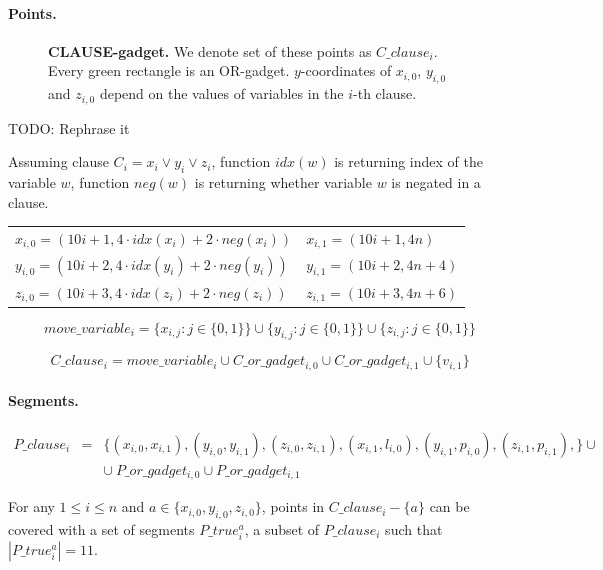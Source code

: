 \paragraph{Points.}


\begin{figure}[h]
\centering
\def\svgwidth{0.8\columnwidth}

\caption{\textbf{CLAUSE-gadget.}
We denote set of these points as $C\_clause_i$.
Every green rectangle is an OR-gadget.
$y$-coordinates of $x_{i, 0}$, $y_{i, 0}$ and $z_{i,0}$
depend on the values of variables in the $i$-th clause.
}
\label{fig:apx_clause}
\end{figure}

TODO: Rephrase it

Assuming clause $C_i = x_i \lor y_i \lor z_i$,
function $idx(w)$ is returning index of the variable $w$,
function $neg(w)$ is returning whether variable $w$ is negated
in a clause.

\begin{center}
\begin{tabular}{ l l }
	$x_{i, 0} = (10i+1, 4\cdot idx(x_i) + 2\cdot neg(x_i))$ &
	$x_{i, 1} = (10i+1, 4n)$ \\
	$y_{i, 0} = (10i+2, 4\cdot idx(y_i) + 2\cdot neg(y_i))$ &
	$y_{i, 1} = (10i+2, 4n + 4)$ \\
	$z_{i, 0} = (10i+3, 4\cdot idx(z_i) + 2\cdot neg(z_i))$ &
	$z_{i, 1} = (10i+3, 4n + 6)$
\end{tabular}
\end{center}
	
 
 $$move\_variable_i = 
 \{x_{i, j} : j \in \{0, 1\}\} \cup
 \{y_{i, j} : j \in \{0, 1\}\} \cup
 \{z_{i, j} : j \in \{0, 1\}\} 
 $$
 
 $$C\_clause_i = 
 move\_variable_i \cup C\_or\_gadget_{i, 0}
 \cup C\_or\_gadget_{i, 1} \cup \{v_{i, 1} \} 
 $$

\paragraph{Segments.}

\begin{eqnarray*}
P\_clause_i & = & \{ (x_{i, 0}, x_{i, 1}),
(y_{i, 0}, y_{i, 1}),
(z_{i, 0}, z_{i, 1}),
(x_{i, 1}, l_{i, 0}),
(y_{i, 1}, p_{i, 0}),
(z_{i, 1}, p_{i, 1}),
\} \cup \\
& & \cup \ P\_or\_gadget_{i, 0} \cup P\_or\_gadget_{i, 1}
\end{eqnarray*}

\begin{lemma}
\label{cover_clauses_solution_true}
For any $1 \le i \le n$ and $a \in \{ x_{i, 0}, y_{i, 0}, z_{i, 0}\}$,
points in $C\_clause_i - \{a\}$ can be covered with 
a set of segments $P\_true^a_i$, a subset of $P\_clause_i$
such that $|P\_true^a_i| = 11$.
\end{lemma}

